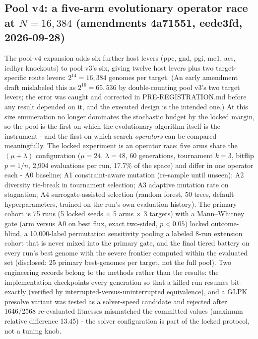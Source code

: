 \documentclass[12pt,a4paper]{article}
\begin{document}
\subsection{Pool v4: a five-arm evolutionary operator race at $N=16{,}384$ (amendments 4a71551, eede3fd, 2026-09-28)}
The pool-v4 expansion adds six further host levers (ppc, gnd, pgi, me1, acs, icdhyr knockouts) to pool v3's six, giving twelve host levers plus two target-specific route levers: $2^{14} = 16{,}384$ genomes per target. (An early amendment draft mislabeled this as $2^{16}=65{,}536$ by double-counting pool v3's two target levers; the error was caught and corrected in PRE-REGISTRATION.md before any result depended on it, and the executed design is the intended one.) At this size enumeration no longer dominates the stochastic budget by the locked margin, so the pool is the first on which the evolutionary algorithm itself is the instrument - and the first on which search \emph{operators} can be compared meaningfully. The locked experiment is an operator race: five arms share the $(\mu{+}\lambda)$ configuration ($\mu=24$, $\lambda=48$, 60 generations, tournament $k=3$, bitflip $p=1/n$, 2{,}904 evaluations per run, 17.7\% of the space) and differ in one operator each - A0 baseline; A1 constraint-aware mutation (re-sample until unseen); A2 diversity tie-break in tournament selection; A3 adaptive mutation rate on stagnation; A4 surrogate-assisted selection (random forest, 50 trees, default hyperparameters, trained on the run's own evaluation history). The primary cohort is 75 runs (5 locked seeds $\times$ 5 arms $\times$ 3 targets) with a Mann--Whitney gate (arm versus A0 on best flux, exact two-sided, $p<0.05$) locked outcome-blind, a 10{,}000-label permutation sensitivity pooling a labeled 8-run extension cohort that is never mixed into the primary gate, and the final tiered battery on every run's best genome with the severe frontier computed within the evaluated set (disclosed: 25 primary best-genomes per target, not the full pool). Two engineering records belong to the methods rather than the results: the implementation checkpoints every generation so that a killed run resumes bit-exactly (verified by interrupted-versus-uninterrupted equivalence), and a GLPK presolve variant was tested as a solver-speed candidate and rejected after 1646/2568 re-evaluated fitnesses mismatched the committed values (maximum relative difference 13.45) - the solver configuration is part of the locked protocol, not a tuning knob.
\end{document}
